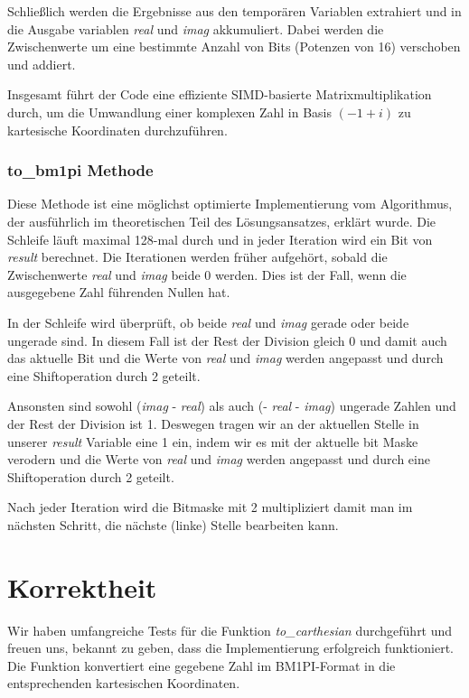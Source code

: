 \documentclass[course=erap]{aspdoc}
\begin{document}
    Schließlich werden die Ergebnisse aus den temporären Variablen extrahiert und in die Ausgabe variablen \textit{real} und \textit{imag} akkumuliert.
    Dabei werden die Zwischenwerte um eine bestimmte Anzahl von Bits (Potenzen von 16) verschoben und addiert.

    Insgesamt führt der Code eine effiziente SIMD-basierte Matrixmultiplikation durch, um die Umwandlung einer komplexen Zahl in Basis $(-1+i)$ zu kartesische Koordinaten durchzuführen.

    \subsubsection{to\_bm1pi Methode}
    Diese Methode ist eine möglichst optimierte Implementierung vom Algorithmus, der ausführlich im theoretischen Teil des Lösungsansatzes, erklärt wurde.
    Die Schleife läuft maximal 128-mal durch und in jeder Iteration wird ein Bit von \textit{result} berechnet.
    Die Iterationen werden früher aufgehört, sobald die Zwischenwerte \textit{real} und \textit{imag} beide 0 werden.
    Dies ist der Fall, wenn die ausgegebene Zahl führenden Nullen hat.

    In der Schleife wird überprüft, ob beide \textit{real} und \textit{imag} gerade oder beide ungerade sind.
    In diesem Fall ist der Rest der Division gleich 0 und damit auch das aktuelle Bit und die Werte von \textit{real} und \textit{imag} werden angepasst und durch eine Shiftoperation durch 2 geteilt.

    Ansonsten sind sowohl (\textit{imag} - \textit{real}) als auch (- \textit{real} - \textit{imag}) ungerade Zahlen und der Rest der Division ist 1.
    Deswegen tragen wir an der aktuellen Stelle in unserer \textit{result} Variable eine 1 ein, indem wir es mit der aktuelle bit Maske verodern und die Werte von \textit{real} und \textit{imag} werden angepasst und durch eine Shiftoperation durch 2 geteilt.

    Nach jeder Iteration wird die Bitmaske mit 2 multipliziert damit man im nächsten Schritt, die nächste (linke) Stelle bearbeiten kann.



    \section{Korrektheit}
    Wir haben umfangreiche Tests für die Funktion \textit{to\_carthesian} durchgeführt und freuen uns, bekannt zu geben, dass die Implementierung erfolgreich funktioniert.
    Die Funktion konvertiert eine gegebene Zahl im BM1PI-Format in die entsprechenden kartesischen Koordinaten.
\end{document}
